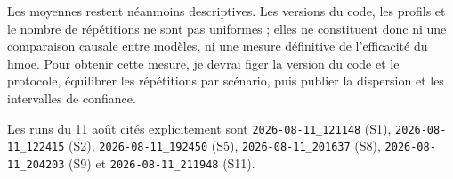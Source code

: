 Les moyennes restent néanmoins descriptives. Les versions du code, les profils
et le nombre de répétitions ne sont pas uniformes ; elles ne constituent donc
ni une comparaison causale entre modèles, ni une mesure définitive de
l'efficacité du \gls{hmoe}. Pour obtenir cette mesure, je devrai figer la
version du code et le protocole, équilibrer les répétitions par scénario, puis
publier la dispersion et les intervalles de confiance.

Les runs du 11 août cités explicitement sont
\texttt{\footnotesize 2026-08-11\_121148} (S1),
\texttt{\footnotesize 2026-08-11\_122415} (S2),
\texttt{\footnotesize 2026-08-11\_192450} (S5),
\texttt{\footnotesize 2026-08-11\_201637} (S8),
\texttt{\footnotesize 2026-08-11\_204203} (S9) et
\texttt{\footnotesize 2026-08-11\_211948} (S11).
